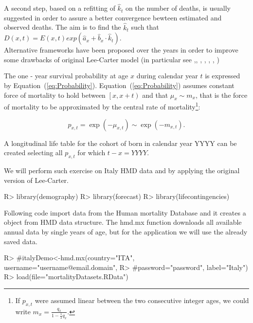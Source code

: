 \documentclass[nojss]{jss}
\begin{document}
A second step, based on a refitting of $\hat{k}_{t}$ on the number of deaths, is usually suggested in order to assure a better convergence bewteen estimated and observed deaths. The aim is to find the $\hat{k}_{t}$ such that $D(x,t)=E(x,t)exp(\hat{a}_{x}+\hat{b}_{x}\cdot\hat{k}_{t})$.\\

Alternative frameworks have been proposed over the years in order to improve some drawbacks of original Lee-Carter model (in particular see \cite{Al},\cite{LM}, \cite{BMS}, \cite{BDV}, \cite{RH}, \cite{CBD}, \cite{Plat})

The one - year survival probability at age $x$ during calendar year $t$ is
expressed by Equation~(\ref{eq:Probability}). Equation~(\ref{eq:Probability})
assumes constant force of mortality to hold between $\left[ x , x + t \right)$
and that $\mu_x \sim m_{x}$, that is the force of mortality to be approximated by the
central rate of mortality\footnote{If $p_{x,t}$ were assumed linear between the two consecutive integer ages, 
we could write $m_{x} = \frac {q_{x}}{1 - \frac{1}{2} q_{x}}$.}:

\begin{equation}
p_{x,t} = \exp \left(  - \mu _{x,t} \right) \sim \exp \left(  - m _{x,t} \right).
\label{eq:Probability}
\end{equation}

A longitudinal life table for the
cohort of born in calendar year YYYY can be created selecting all $p_{x,t}$ for
which $t-x=YYYY$. 

We will perform such exercise on Italy HMD data and by applying the original version of Lee-Carter.

\begin{Schunk}
\begin{Sinput}
R> library(demography)
R> library(forecast)
R> library(lifecontingencies)
\end{Sinput}
\end{Schunk}

Following code import data from the Human mortality Database and it creates a  object from HMD data structure.
The hmd.mx function downloads all available annual data by single years of age, but for the application we will use the already saved data.
\begin{Schunk}
\begin{Sinput}
R> #italyDemo<-hmd.mx(country="ITA", username="username@email.domain", 
R> #password="password", label="Italy")
R> load(file="mortalityDatasets.RData")
\end{Sinput}
\end{Schunk}
\end{document}
